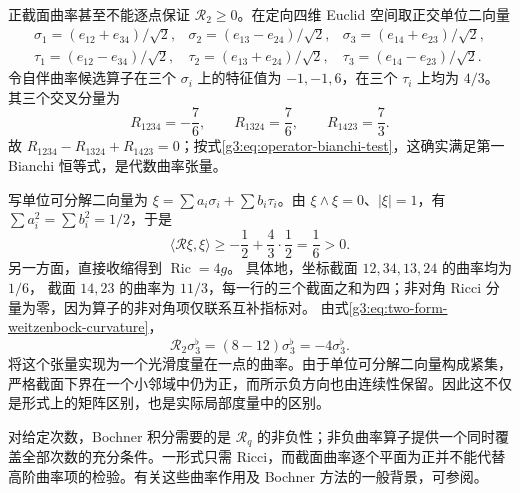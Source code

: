 \begin{example}\label{g3:exm:positive-sectional-negative-bochner}
	正截面曲率甚至不能逐点保证 \(\mathcal R_2\ge0\)。在定向四维 Euclid 空间取正交单位二向量
	\[
		\begin{array}{lll}
		\sigma_1=(e_{12}+e_{34})/\sqrt2,&
		\sigma_2=(e_{13}-e_{24})/\sqrt2,&
		\sigma_3=(e_{14}+e_{23})/\sqrt2,\\
		\tau_1=(e_{12}-e_{34})/\sqrt2,&
		\tau_2=(e_{13}+e_{24})/\sqrt2,&
		\tau_3=(e_{14}-e_{23})/\sqrt2.
		\end{array}
	\]
	令自伴曲率候选算子在三个 \(\sigma_i\) 上的特征值为
	\(-1,-1,6\)，在三个 \(\tau_i\) 上均为 \(4/3\)。其三个交叉分量为
	\[
		R_{1234}=-\frac76,\qquad R_{1324}=\frac76,\qquad
		R_{1423}=\frac73.
	\]
	故 \(R_{1234}-R_{1324}+R_{1423}=0\)；按式\eqref{g3:eq:operator-bianchi-test}，这确实满足第一 Bianchi 恒等式，是代数曲率张量。

	写单位可分解二向量为
	\(\xi=\sum a_i\sigma_i+\sum b_i\tau_i\)。由
	\(\xi\wedge\xi=0\)、\(|\xi|=1\)，有
	\(\sum a_i^2=\sum b_i^2=1/2\)，于是
	\[
		\langle\mathcal R\xi,\xi\rangle
		\ge-\frac12+\frac43\cdot\frac12=\frac16>0.
	\]
	另一方面，直接收缩得到 \(\operatorname{Ric}=4g\)。
	具体地，坐标截面 \(12,34,13,24\) 的曲率均为 \(1/6\)，
	截面 \(14,23\) 的曲率为 \(11/3\)，每一行的三个截面之和为四；非对角 Ricci 分量为零，因为算子的非对角项仅联系互补指标对。
	由式\eqref{g3:eq:two-form-weitzenbock-curvature}，
	\[
		\mathcal R_2\sigma_3^\flat
		=(8-12)\sigma_3^\flat=-4\sigma_3^\flat.
	\]
	将这个张量实现为一个光滑度量在一点的曲率。由于单位可分解二向量构成紧集，严格截面下界在一个小邻域中仍为正，而所示负方向也由连续性保留。因此这不仅是形式上的矩阵区别，也是实际局部度量中的区别。
\end{example}

对给定次数，Bochner 积分需要的是 \(\mathcal R_q\) 的非负性；非负曲率算子提供一个同时覆盖全部次数的充分条件。一形式只需 Ricci，而截面曲率逐个平面为正并不能代替高阶曲率项的检验。有关这些曲率作用及 Bochner 方法的一般背景，可参阅\cite[第9章，9.2--9.4节]{Petersen2016}。
